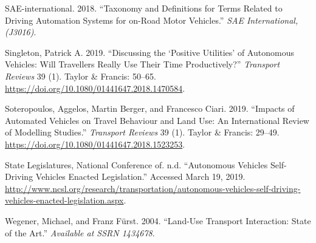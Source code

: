 \documentclass[12pt,]{article}
\begin{document}
\leavevmode\hypertarget{ref-sae2018taxonomy}{}%
SAE-international. 2018. ``Taxonomy and Definitions for Terms Related to
Driving Automation Systems for on-Road Motor Vehicles.'' \emph{SAE
International,(J3016)}.

\leavevmode\hypertarget{ref-singleton2019discussing}{}%
Singleton, Patrick A. 2019. ``Discussing the `Positive Utilities' of
Autonomous Vehicles: Will Travellers Really Use Their Time
Productively?'' \emph{Transport Reviews} 39 (1). Taylor \& Francis:
50--65. \url{https://doi.org/10.1080/01441647.2018.1470584}.

\leavevmode\hypertarget{ref-soteropoulos2019impacts}{}%
Soteropoulos, Aggelos, Martin Berger, and Francesco Ciari. 2019.
``Impacts of Automated Vehicles on Travel Behaviour and Land Use: An
International Review of Modelling Studies.'' \emph{Transport Reviews} 39
(1). Taylor \& Francis: 29--49.
\url{https://doi.org/10.1080/01441647.2018.1523253}.

\leavevmode\hypertarget{ref-NCSL2019AV}{}%
State Legislatures, National Conference of. n.d. ``Autonomous Vehicles
\textbar{} Self-Driving Vehicles Enacted Legislation.'' Accessed March
19, 2019.
\url{http://www.ncsl.org/research/transportation/autonomous-vehicles-self-driving-vehicles-enacted-legislation.aspx}.

\leavevmode\hypertarget{ref-wegener2004land}{}%
Wegener, Michael, and Franz Fürst. 2004. ``Land-Use Transport
Interaction: State of the Art.'' \emph{Available at SSRN 1434678}.
\end{document}

